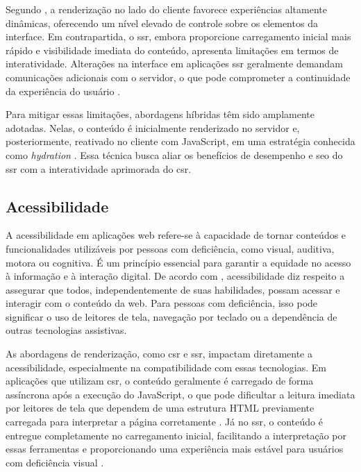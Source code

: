 Segundo , a renderização no lado do cliente favorece experiências altamente dinâmicas, oferecendo um nível elevado de controle sobre os elementos da interface. Em contrapartida, o \acrshort{ssr}, embora proporcione carregamento inicial mais rápido e visibilidade imediata do conteúdo, apresenta limitações em termos de interatividade. Alterações na interface em aplicações \acrshort{ssr} geralmente demandam comunicações adicionais com o servidor, o que pode comprometer a continuidade da experiência do usuário \cite{atori2024, splunk2023}.

Para mitigar essas limitações, abordagens híbridas têm sido amplamente adotadas. Nelas, o conteúdo é inicialmente renderizado no servidor e, posteriormente, reativado no cliente com JavaScript, em uma estratégia conhecida como \emph{hydration} \cite{splunk2023}. Essa técnica busca aliar os benefícios de desempenho e \acrshort{seo} do \acrshort{ssr} com a interatividade aprimorada do \acrshort{csr}.


\subsection{Acessibilidade}
\label{subsec:acessibilidade}

A acessibilidade em aplicações web refere-se à capacidade de tornar conteúdos e funcionalidades utilizáveis por pessoas com deficiência, como visual, auditiva, motora ou cognitiva. É um princípio essencial para garantir a equidade no acesso à informação e à interação digital. De acordo com \cite{pixelfree2023access}, acessibilidade diz respeito a assegurar que todos, independentemente de suas habilidades, possam acessar e interagir com o conteúdo da web. Para pessoas com deficiência, isso pode significar o uso de leitores de tela, navegação por teclado ou a dependência de outras tecnologias assistivas.

As abordagens de renderização, como \acrshort{csr} e \acrshort{ssr}, impactam diretamente a acessibilidade, especialmente na compatibilidade com essas tecnologias. Em aplicações que utilizam \acrshort{csr}, o conteúdo geralmente é carregado de forma assíncrona após a execução do JavaScript, o que pode dificultar a leitura imediata por leitores de tela que dependem de uma estrutura HTML previamente carregada para interpretar a página corretamente \cite{pixelfree2023access}. Já no \acrshort{ssr}, o conteúdo é entregue completamente no carregamento inicial, facilitando a interpretação por essas ferramentas e proporcionando uma experiência mais estável para usuários com deficiência visual \cite{atori2024}.

